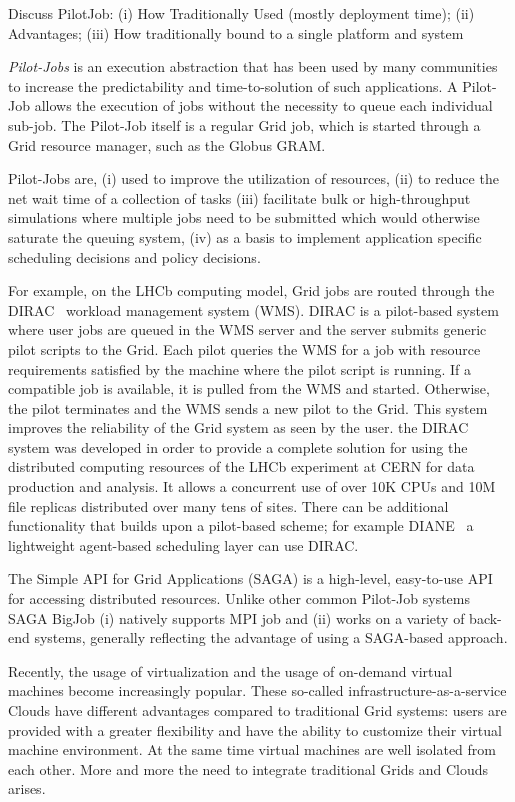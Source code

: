 \documentclass[conference,final]{IEEEtran}
\begin{document}
Discuss PilotJob: (i) How Traditionally Used (mostly deployment time);
(ii) Advantages; (iii) How traditionally bound to a single platform
and system

\emph{Pilot-Jobs} is an execution abstraction that has been used by
many communities to increase the predictability and time-to-solution
of such applications. A Pilot-Job allows the execution of jobs without
the necessity to queue each individual sub-job. The Pilot-Job itself
is a regular Grid job, which is started through a Grid resource
manager, such as the Globus GRAM.

Pilot-Jobs are, (i) used to improve the utilization of resources, (ii)
to reduce the net wait time of a collection of tasks (iii) facilitate
bulk or high-throughput simulations where multiple jobs need to be
submitted which would otherwise saturate the queuing system, (iv) as a
basis to implement application specific scheduling decisions and
policy decisions.

For example, on the LHCb computing model, Grid jobs are routed through
the DIRAC~\cite{dirac} workload management system (WMS). DIRAC is a
pilot-based system where user jobs are queued in the WMS server and
the server submits generic pilot scripts to the Grid. Each pilot
queries the WMS for a job with resource requirements satisfied by the
machine where the pilot script is running. If a compatible job is
available, it is pulled from the WMS and started. Otherwise, the pilot
terminates and the WMS sends a new pilot to the Grid. This system
improves the reliability of the Grid system as seen by the user.  the
DIRAC system was developed in order to provide a complete solution for
using the distributed computing resources of the LHCb experiment at
CERN for data production and analysis. It allows a concurrent use of
over 10K CPUs and 10M file replicas distributed over many tens of
sites.  There can be additional functionality that builds upon a
pilot-based scheme; for example DIANE~\cite{diane} a lightweight
agent-based scheduling layer can use DIRAC.

The Simple API for Grid Applications (SAGA) is a high-level,
easy-to-use API for accessing distributed resources. Unlike other
common Pilot-Job systems SAGA BigJob (i) natively supports MPI job and
(ii) works on a variety of back-end systems, generally reflecting the
advantage of using a SAGA-based approach.

Recently, the usage of virtualization and the usage of on-demand
virtual machines become increasingly popular. These so-called
infrastructure-as-a-service Clouds have different advantages compared
to traditional Grid systems: users are provided with a greater
flexibility and have the ability to customize their virtual machine
environment. At the same time virtual machines are well isolated from
each other. More and more the need to integrate traditional Grids and
Clouds arises.
\end{document}
